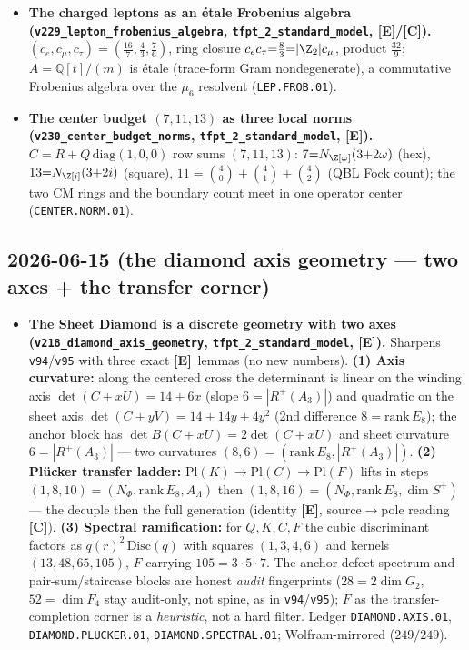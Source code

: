 \documentclass[11pt]{article}
\providecommand{\mE}{\textbf{[E]}}\providecommand{\mC}{\textbf{[C]}}
\begin{document}
\begin{itemize}
\item \textbf{The charged leptons as an \'etale Frobenius algebra (\texttt{v229\_lepton\_frobenius\_algebra},
  \texttt{tfpt\_2\_standard\_model}, \mE/\mC).} $(c_e,c_\mu,c_\tau){=}(\tfrac{16}7,\tfrac43,\tfrac76)$,
  ring closure $c_e c_\tau{=}\tfrac83{=}|\Z_2|c_\mu$, product $\tfrac{32}9$; $A{=}\mathbb Q[t]/(m)$ is \'etale
  (trace-form Gram nondegenerate), a commutative Frobenius algebra over the $\mu_6$ resolvent
  (\texttt{LEP.FROB.01}).
\item \textbf{The center budget $(7,11,13)$ as three local norms (\texttt{v230\_center\_budget\_norms},
  \texttt{tfpt\_2\_standard\_model}, \mE).} $C{=}R{+}Q\,\mathrm{diag}(1,0,0)$ row sums $(7,11,13)$:
  $7{=}N_{\Z[\omega]}(3{+}2\omega)$ (hex), $13{=}N_{\Z[i]}(3{+}2i)$ (square), $11{=}\binom40{+}\binom41{+}\binom42$
  (QBL Fock count); the two CM rings and the boundary count meet in one operator center
  (\texttt{CENTER.NORM.01}).
\end{itemize}

\subsection*{2026-06-15 (the diamond axis geometry --- two axes + the transfer corner)}
\begin{itemize}
\item \textbf{The Sheet Diamond is a discrete geometry with two axes
  (\texttt{v218\_diamond\_axis\_geometry}, \texttt{tfpt\_2\_standard\_model}, \mE).} Sharpens
  \texttt{v94}/\texttt{v95} with three exact \mE\ lemmas (no new numbers). \textbf{(1) Axis curvature:}
  along the centered cross the determinant is linear on the winding axis $\det(C{+}xU)=14{+}6x$ (slope
  $6{=}|R^+(A_3)|$) and quadratic on the sheet axis $\det(C{+}yV)=14{+}14y{+}4y^2$ (2nd difference
  $8{=}\mathrm{rank}\,E_8$); the anchor block has $\det B(C{+}xU)=2\det(C{+}xU)$ and sheet curvature
  $6{=}|R^+(A_3)|$ --- two curvatures $(8,6)=(\mathrm{rank}\,E_8,|R^+(A_3)|)$. \textbf{(2) Pl\"ucker
  transfer ladder:} $\mathrm{Pl}(K)\to\mathrm{Pl}(C)\to\mathrm{Pl}(F)$ lifts in steps
  $(1,8,10)=(N_\Phi,\mathrm{rank}\,E_8,A_\Lambda)$ then $(1,8,16)=(N_\Phi,\mathrm{rank}\,E_8,\dim S^+)$ ---
  the decuple then the full generation (identity \mE, source$\to$pole reading \mC). \textbf{(3) Spectral
  ramification:} for $Q,K,C,F$ the cubic discriminant factors as $q(r)^2\,\mathrm{Disc}(q)$ with squares
  $(1,3,4,6)$ and kernels $(13,48,65,105)$, $F$ carrying $105=3{\cdot}5{\cdot}7$. The anchor-defect
  spectrum and pair-sum/staircase blocks are honest \emph{audit} fingerprints ($28{=}2\dim G_2$,
  $52{=}\dim F_4$ stay audit-only, not spine, as in \texttt{v94}/\texttt{v95}); $F$ as the
  transfer-completion corner is a \emph{heuristic}, not a hard filter. Ledger \texttt{DIAMOND.AXIS.01},
  \texttt{DIAMOND.PLUCKER.01}, \texttt{DIAMOND.SPECTRAL.01}; Wolfram-mirrored ($249/249$).
\end{itemize}
\end{document}
